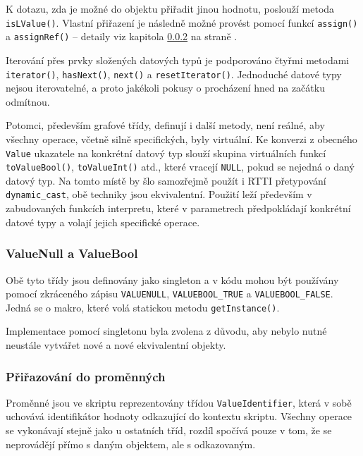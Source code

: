 \documentclass[11pt,twoside,a4paper]{book}
\begin{document}
K dotazu, zda je možné do objektu přiřadit jinou hodnotu, poslouží metoda \texttt{isLValue()}. Vlastní přiřazení je následně možné provést pomocí funkcí \texttt{assign()} a \texttt{assignRef()} -- detaily viz kapitola \ref{valuereference_a_prirazovani_do_promennych} na straně \pageref{valuereference_a_prirazovani_do_promennych}.

Iterování přes prvky složených datových typů je podporováno čtyřmi metodami \texttt{iterator()}, \texttt{hasNext()}, \texttt{next()} a \texttt{resetIterator()}. Jednoduché datové typy nejsou iterovatelné, a proto jakékoli pokusy o procházení hned na začátku odmítnou.

Potomci, především grafové třídy, definují i další metody, není reálné, aby všechny operace, včetně silně specifických, byly virtuální. Ke konverzi z obecného \texttt{Value} ukazatele na konkrétní datový typ slouží skupina virtuálních funkcí \texttt{toValueBool()}, \texttt{toValueInt()} atd., které vracejí \texttt{NULL}, pokud se nejedná o daný datový typ. Na tomto místě by šlo samozřejmě použít i RTTI přetypování \texttt{dynamic\_cast}, obě techniky jsou ekvivalentní. Použití leží především v zabudovaných funkcích interpretu, které v parametrech předpokládají konkrétní datové typy a volají jejich specifické operace.


\subsubsection{ValueNull a ValueBool}

Obě tyto třídy jsou definovány jako singleton a v kódu mohou být používány pomocí zkrá\-ce\-né\-ho zápisu \texttt{VALUENULL}, \texttt{VALUEBOOL\_TRUE} a \texttt{VALUEBOOL\_FALSE}. Jedná se o makro, které volá statickou metodu \texttt{getInstance()}.

Implementace pomocí singletonu byla zvolena z důvodu, aby nebylo nutné neustále vytvářet nové a nové ekvivalentní objekty.


\subsubsection{Přiřazování do proměnných}
\label{valuereference_a_prirazovani_do_promennych}

Proměnné jsou ve skriptu reprezentovány třídou \texttt{ValueIdentifier}, která v sobě u\-cho\-vá\-vá identifikátor hodnoty odkazující do kontextu skriptu. Všechny operace se vykonávají stejně jako u ostatních tříd, rozdíl spočívá pouze v tom, že se neprovádějí přímo s daným objektem, ale s odkazovaným.
\end{document}
